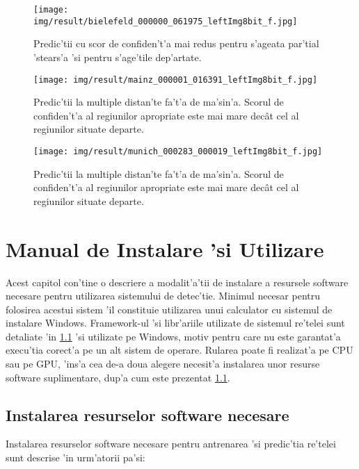 \documentclass[12pt,a4paper,twoside]{report}
\begin{document}
\begin{figure}[H]
  \centering
  \texttt{[image: img/result/bielefeld\_000000\_061975\_leftImg8bit\_f.jpg]}
   \caption{Predic'tii cu scor de confiden't'a mai redus pentru s'ageata par'tial 'stears'a 'si pentru s'age'tile dep'artate.}
\end{figure}

\begin{figure}[H]
  \centering
  \texttt{[image: img/result/mainz\_000001\_016391\_leftImg8bit\_f.jpg]}
  \caption{Predic'tii la multiple distan'te fa't'a de ma'sin'a. Scorul de confiden't'a al regiunilor apropriate este mai mare dec\^at cel al regiunilor situate departe.}
\end{figure}

\begin{figure}[H]
  \centering
  \texttt{[image: img/result/munich\_000283\_000019\_leftImg8bit\_f.jpg]}
   \caption{Predic'tii la multiple distan'te fa't'a de ma'sin'a. Scorul de confiden't'a al regiunilor apropriate este mai mare dec\^at cel al regiunilor situate departe.}
\end{figure}


\chapter{Manual de Instalare 'si Utilizare}
Acest capitol con'tine o descriere a modalit'a'tii de instalare a resursele software necesare pentru utilizarea sistemului de detec'tie. Minimul necesar pentru folosirea acestui sistem 'il constituie utilizarea unui calculator cu sistemul de instalare Windows. Framework-ul 'si libr'ariile utilizate de sistemul re'telei sunt detaliate 'in \ref{ch:install} 'si utilizate pe Windows, motiv pentru care nu este garantat'a execu'tia corect'a pe un alt sistem de operare. Rularea poate fi realizat'a pe CPU sau pe GPU, 'ins'a cea de-a doua  alegere necesit'a instalarea unor resurse software suplimentare, dup'a cum este prezentat \ref{ch:install}.

\section{Instalarea resurselor software necesare}
\label{ch:install}
Instalarea resurselor software necesare pentru antrenarea 'si predic'tia re'telei sunt descrise 'in urm'atorii pa'si:
\end{document}
